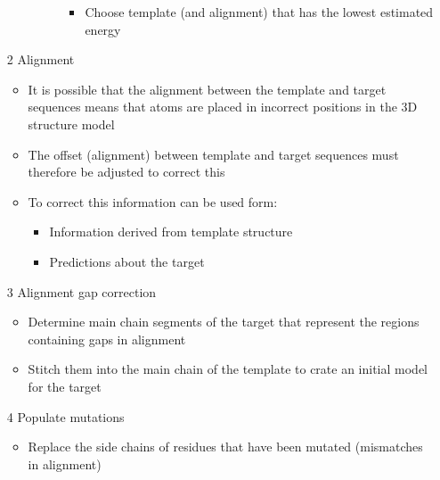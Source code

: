 \documentclass[a4paper]{article}
\begin{document}
\begin{enumerate}
\begin{itemize}
\begin{description}
\begin{itemize}
              \item
                Choose template (and alignment) that has the lowest estimated
                energy
            \end{itemize}
        \end{description}

    \end{itemize}

  \item[2]
    Alignment

    \begin{itemize}
      \item
        It is possible that the alignment between the template and target
        sequences means that atoms are placed in incorrect positions in the 3D
        structure model

      \item
        The offset (alignment) between template and target sequences must
        therefore be adjusted to correct this

      \item
        To correct this information can be used form:

        \begin{itemize}
          \item
            Information derived from template structure

          \item
            Predictions about the target
        \end{itemize}
    \end{itemize}

  \item[3]
    Alignment gap correction

    \begin{itemize}
      \item
        Determine main chain segments of the target that represent the regions
        containing gaps in alignment

      \item
        Stitch them into the main chain of the template to crate an initial
        model for the target
    \end{itemize}

  \item[4]
    Populate mutations

    \begin{itemize}
      \item
        Replace the side chains of residues that have been mutated (mismatches
        in alignment)
    \end{itemize}


\end{enumerate}
\end{document}
